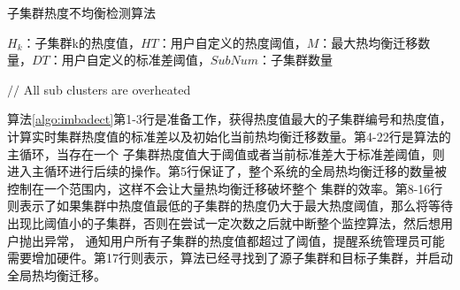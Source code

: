 \begin{algorithm}
    \caption{子集群热度不均衡检测算法}
    \label{algo:imbadect}
    \begin{algorithmic}[1] %
    \Require $H_k$：子集群k的热度值，$HT$：用户自定义的热度阈值，$M$：最大热均衡迁移数量，$DT$：用户自定义的标准差阈值，$SubNum$：子集群数量
    
          \State $//$ All sub clusters are overheated
          \EndIf
        \EndWhile
      \EndIf
    \EndWhile
    \end{algorithmic}
\end{algorithm}

算法\ref{algo:imbadect}第1-3行是准备工作，获得热度值最大的子集群编号和热度值，计算实时集群热度值的标准差以及初始化当前热均衡迁移数量。第4-22行是算法的主循环，当存在一个
子集群热度值大于阈值或者当前标准差大于标准差阈值，则进入主循环进行后续的操作。第5行保证了，整个系统的全局热均衡迁移的数量被控制在一个范围内，这样不会让大量热均衡迁移破坏整个
集群的效率。第8-16行则表示了如果集群中热度值最低的子集群的热度仍大于最大热度阈值，那么将等待出现比阈值小的子集群，否则在尝试一定次数之后就中断整个监控算法，然后想用户抛出异常，
通知用户所有子集群的热度值都超过了阈值，提醒系统管理员可能需要增加硬件。第17行则表示，算法已经寻找到了源子集群和目标子集群，并启动全局热均衡迁移。


